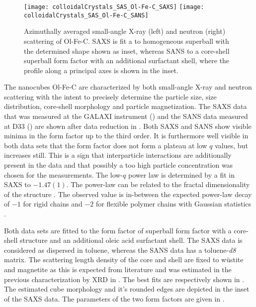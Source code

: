 \documentclass[\main/dresen_thesis.tex]{subfiles}
\begin{document}
  \label{sec:colloidalCrystals:nanoparticle:sas}

  \begin{figure}[htbp]
    \centering
    \texttt{[image: colloidalCrystals\_SAS\_Ol-Fe-C\_SAXS]}
    \texttt{[image: colloidalCrystals\_SAS\_Ol-Fe-C\_SANS]}
    \caption{\label{fig:colloidalCrystals:nanoparticle:sas}Azimuthally averaged small-angle X-ray (left) and neutron (right) scattering of Ol-Fe-C. SAXS is fit a to homogeneous superball with the determined shape shown as inset, whereas SANS to a core-shell superball form factor with an additional surfactant shell, where the profile along a principal axes is shown in the inset.}
  \end{figure}
  The nanocubes Ol-Fe-C are characterized by both small-angle X-ray and neutron scattering with the intent to precisely determine the particle size, size distribution, core-shell morphology and particle magnetization.
  The SAXS data that was measured at the GALAXI instrument () and the SANS data measured at D33 () are shown after data reduction in .
  Both SAXS and SANS show visible minima in the form factor up to the third order.
  It is furthermore well visible in both data sets that the form factor does not form a plateau at low $q$ values, but increases still.
  This is a sign that interparticle interactions are additionally present in the data and that possibly a too high particle concentration was chosen for the measurements.
  The low-$q$ power law is determined by a fit in SAXS to $-1.47(1)$.
  The power-law can be related to the fractal dimensionality of the structure \cite{Mildner_1986_Smalla}.
  The observed value is in-between the expected power-law decay of $-1$ for rigid chains and $-2$ for flexible polymer chains with Gaussian statistics \cite{Beaucage_1996_Smalla}.

  Both data sets are fitted to the form factor of superball form factor with a core-shell structure and an additional oleic acid surfactant shell.
  The SAXS data is considered as dispersed in toluene, whereas the SANS data has a toluene-\textit{d8} matrix.
  The scattering length density of the core and shell are fixed to w\"ustite and magnetite as this is expected from literature \cite{Wetterskog_2013_Anoma} and was estimated in the previous characterization by XRD in .
  The best fits are respectively shown in .
  The estimated cube morphology and it's rounded edges are depicted in the inset of the SAXS data.
  The parameters of the two form factors are given in .
\end{document}
